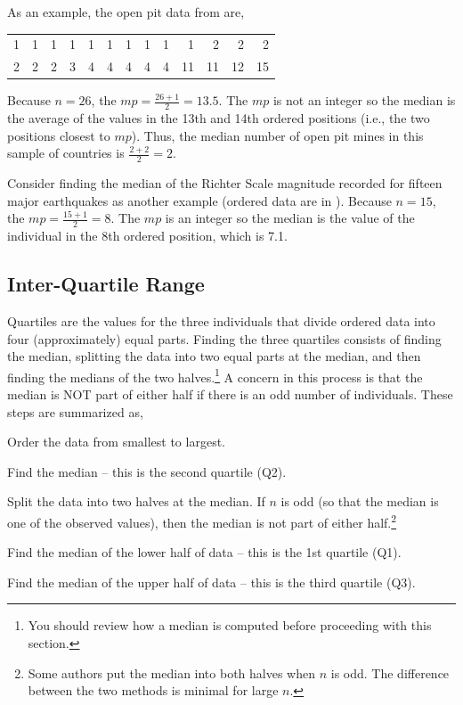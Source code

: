 \documentclass[10pt,openany]{book}\usepackage[]{graphicx}\usepackage[]{color}
\begin{document}
As an example, the open pit data from  are,

\begin{tabular}{rrrrrrrrrrrrr}
  1 & 1 & 1 & 1 & 1 & 1 & 1 & 1 & 1 & 1 & 2 & 2 & 2 \\ 
  2 & 2 & 2 & 3 & 4 & 4 & 4 & 4 & 4 & 11 & 11 & 12 & 15 \\ 
  \end{tabular}


Because $n=26$, the $mp=\frac{26+1}{2}=13.5$. The $mp$ is not an integer so the median is the average of the values in the 13th and 14th ordered positions (i.e., the two positions closest to $mp$). Thus, the median number of open pit mines in this sample of countries is $\frac{2+2}{2}=2$.

Consider finding the median of the Richter Scale magnitude recorded for fifteen major earthquakes as another example (ordered data are in ). Because $n=15$, the $mp=\frac{15+1}{2}=8$. The $mp$ is an integer so the median is the value of the individual in the 8th ordered position, which is 7.1.



\subsection{Inter-Quartile Range}
Quartiles are the values for the three individuals that divide ordered data into four (approximately) equal parts. Finding the three quartiles consists of finding the median, splitting the data into two equal parts at the median, and then finding the medians of the two halves.\footnote{You should review how a median is computed before proceeding with this section.}  A concern in this process is that the median is NOT part of either half if there is an odd number of individuals. These steps are summarized as,
\begin{Enumerate}
  \item Order the data from smallest to largest.
  \item Find the median -- this is the second quartile (Q2).
  \item Split the data into two halves at the median. If $n$ is odd (so that the median is one of the observed values), then the median is not part of either half.\footnote{Some authors put the median into both halves when $n$ is odd. The difference between the two methods is minimal for large $n$.}
  \item Find the median of the lower half of data -- this is the 1st quartile (Q1).
  \item Find the median of the upper half of data -- this is the third quartile (Q3).
\end{Enumerate}
\end{document}
